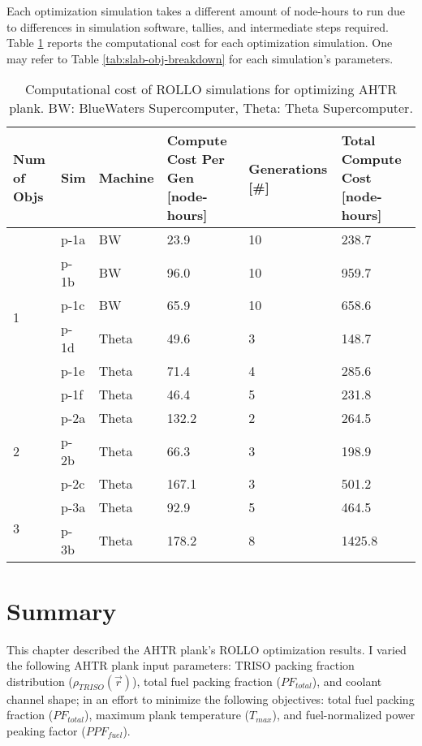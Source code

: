 Each optimization simulation takes a different amount of node-hours to run due to 
differences in simulation software, tallies, and intermediate steps required. 
Table \ref{tab:plank-compute-cost} reports the computational cost for each optimization 
simulation. 
One may refer to Table \ref{tab:slab-obj-breakdown} for each simulation's parameters.
\begin{table}[htbp!]
    \centering
    \onehalfspacing
    \caption{Computational cost of \gls{ROLLO} simulations for optimizing \gls{AHTR}
    plank. BW: BlueWaters Supercomputer, Theta: Theta Supercomputer.}
	\label{tab:plank-compute-cost}
    \footnotesize
    \begin{tabular}{p{1.4cm}|p{1cm}lp{3.5cm}lp{3.5cm}}
    \hline 
    \textbf{Num of Objs} & \textbf{Sim} & \textbf{Machine} & 
    \textbf{Compute Cost Per Gen [node-hours]} &\textbf{Generations [\#]} & 
    \textbf{Total Compute Cost [node-hours]} \\
    \hline
    \multirow{6}{2cm}{1} 
    & p-1a & BW & 23.9 & 10 & 238.7 \\
    & p-1b & BW & 96.0 & 10 & 959.7 \\
    & p-1c & BW & 65.9 & 10 & 658.6 \\
    & p-1d & Theta & 49.6 & 3 & 148.7 \\
    & p-1e & Theta & 71.4 & 4 & 285.6 \\
    & p-1f & Theta & 46.4 & 5 & 231.8 \\
    \hline
    \multirow{3}{2cm}{2}
    & p-2a & Theta & 132.2 & 2 & 264.5 \\
    & p-2b & Theta & 66.3 & 3 & 198.9 \\
    & p-2c & Theta & 167.1 & 3 & 501.2 \\
    \hline
    \multirow{2}{2cm}{3}
    & p-3a & Theta & 92.9 & 5 & 464.5 \\
    & p-3b & Theta & 178.2 & 8 & 1425.8 \\
    \hline
    \end{tabular}
\end{table}

\pagebreak
\section{Summary}
\glsresetall
This chapter described the \gls{AHTR} plank's \gls{ROLLO} optimization results. 
I varied the following \gls{AHTR} plank input parameters: \gls{TRISO} packing fraction 
distribution ($\rho_{TRISO}(\vec{r})$), total fuel packing fraction ($PF_{total}$), and 
coolant channel shape; in an effort to minimize the following objectives: total 
fuel packing fraction ($PF_{total}$), maximum plank temperature ($T_{max}$), and 
fuel-normalized power peaking factor ($PPF_{fuel}$). 

